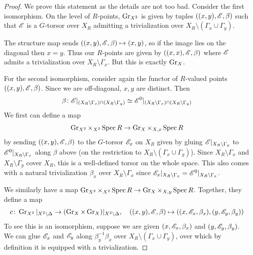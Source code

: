 \documentclass[12pt]{article}
\begin{document}
\begin{proof}
    We prove this statement as the details are not too bad. Consider the first isomorphism. On the level of $R$-points, $\operatorname{Gr}_{X^2}$ is given by tuples $ ((x,y), \mathscr{E}, \beta)$ such that $\mathscr{E}$ is a $G$-torsor over $X_R$ admitting a trivialization over $X_R \setminus (\Gamma_x \cup \Gamma_y)$. 
    
    The structure map sends $((x,y), \mathscr{E}, \beta) \mapsto (x,y)$, so if the image lies on the diagonal then $x = y$. Thus our $R$-points are given by $((x,x), \mathscr{E}, \beta)$ where $\mathscr{E}$ admits a trivialization over $X_R \setminus \Gamma_x$. But this is exactly $\operatorname{Gr}_X$.

    For the second isomorphism, consider again the functor of $R$-valued points $((x,y), \mathscr{E}, \beta)$. Since we are off-diagonal, $x,y$ are distinct. Then
    \[\beta \colon \mathscr{E}\vert_{(X_R \setminus \Gamma_x) \cap (X_R \setminus \Gamma_y)} \simeq \mathscr{E}^0\vert_{(X_R \setminus \Gamma_x) \cap (X_R \setminus \Gamma_y)}\]
    We first can define a map
    \[\operatorname{Gr}_{X^2} \times_{X^2} \operatorname{Spec} R \to \operatorname{Gr}_X \times_{X,x} \operatorname{Spec} R\]
    by sending $((x,y), \mathscr{E}, \beta)$ to the $G$-torsor $\mathscr{E}_x$ on $X_R$ given by gluing $\mathscr{E}\vert_{X_R \setminus \Gamma_y}$ to $\mathscr{E}^0\vert_{X_R \setminus \Gamma_x}$ along $\beta$ above (on the restriction to $X_R \setminus (\Gamma_x \cup \Gamma_y)$). Since $X_R \setminus \Gamma_x$ and $X_R\setminus \Gamma_y$ cover $X_R$, this is a well-defined torsor on the whole space. This also comes with a natural trivialization $\beta_x$ over $X_R \setminus \Gamma_x$ since $\mathscr{E}_x \vert_{X_R \setminus \Gamma_x} = \mathscr{E}^0\vert_{X_R \setminus \Gamma_x}$.

    We similarly have a map $\operatorname{Gr}_{X^2} \times_{X^2} \operatorname{Spec} R \to \operatorname{Gr}_X \times_{X,y} \operatorname{Spec} R$. Together, they define a map
    \[c\colon \operatorname{Gr}_{X^2} \vert_{X^2 \setminus \Delta} \to (\operatorname{Gr}_X \times \operatorname{Gr}_X)\vert_{X^2 \setminus \Delta}, \quad ((x,y), \mathscr{E}, \beta) \mapsto ((x, \mathscr{E}_x, \beta_x), (y, \mathscr{E}_y, \beta_y))\]
    To see this is an isomorphism, suppose we are given $(x, \mathscr{E}_x, \beta_x)$ and $(y,\mathscr{E}_y, \beta_y)$. We can glue $\mathscr{E}_x$ and $\mathscr{E}_y$ along $\beta_y^{-1}\beta_x$ over $X_R \setminus (\Gamma_x \cup \Gamma_y)$, over which by definition it is equipped with a trivialization.
\end{proof}
\end{document}
